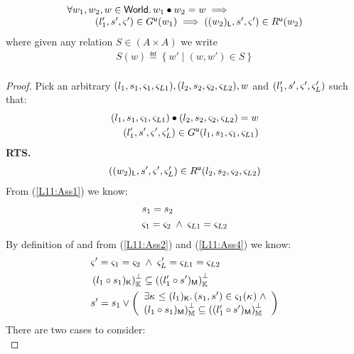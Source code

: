 \begin{lemma}[] \label{lem:updateGContainment}
%
\[
\begin{array}{l}
	\forall w_1, w_2, w \in \textsf{World}.\, w_1 \bullet w_2 = w \implies\\
	\hspace*{1cm}(l'_1, s', \varsigma_{}') \in G^{\textsf{u}}(w_1) \implies ((w_2)_{\textsf{L}}, s', \varsigma_{}') \in R^{\textsf{u}}(w_2)
\end{array}
\]
%
where given any relation $S \in (A \times A)$ we write
%
\[
\begin{array}{l}
	S(w) \eqdef \left\{w' \;|\; (w, w') \in S \right\}\\
\end{array}
\]
%
\begin{proof} Pick an arbitrary $(l_1, s_1, \varsigma_{1}, \varsigma_{L1}), (l_2, s_2, \varsigma_{2}, \varsigma_{L2}), w$ and $(l'_1, s', \varsigma_{}', \varsigma_{L}')$ such that:
%
\begin{align}
	(l_1, s_1, \varsigma_{1}, \varsigma_{L1}) \bullet (l_2, s_2, \varsigma_{2}, \varsigma_{L2}) = w \label{L11:Ass1}\\
	(l'_1, s', \varsigma_{}', \varsigma_{L}') \in G^{\textsf{u}}(l_1, s_1, \varsigma_{1}, \varsigma_{L1}) \label{L11:Ass2}
\end{align}
%
\textbf{RTS.}
%
\begin{align}
	((w_2)_{\textsf{L}}, s', \varsigma_{}', \varsigma_{L}') \in R^{\textsf{u}}(l_2, s_2, \varsigma_{2}, \varsigma_{L2}) \label{L11:Goal}
\end{align}
From (\ref{L11:Ass1}) we know:
%
\begin{align}
	&s_1 = s_2 \label{L11:Ass3}\\
	&\varsigma_{1} = \varsigma_{2} \;\land\; \varsigma_{L1} = \varsigma_{L2} \label{L11:Ass4}
\end{align}
%
By definition of \updateG and from (\ref{L11:Ass2}) and (\ref{L11:Ass4}) we know:
%
\begin{align}
	& \varsigma_{}' = \varsigma_{1} = \varsigma_{2} \;\land\; \varsigma_{L}' = \varsigma_{L1} = \varsigma_{L2} \label{L11:Ass5} \\
	& \left( l_1 \circ s_1)_{\textsf{K}}\right)_{\mathbb{K}}^{\bot} \subseteq \left( (l'_1 \circ s')_{\textsf{M}}\right)_{\mathbb{K}}^{\bot} \label{L11:Perms} \\
	& s' = s_1 \lor 
	\left(\begin{array}{l}
		\exists \kappa_{} \leq (l_1)_{\textsf{K}}.\,  (s_1, s') \in \varsigma_{1}(\kappa_{}) \;\land \\
		\left( l_1 \circ s_1)_{\textsf{M}}\right)_{\mathbb{M}}^{\bot} \subseteq \left( (l'_1 \circ s')_{\textsf{M}}\right)_{\mathbb{M}}^{\bot}
	\end{array} \right) \nonumber
\end{align}
%
There are two cases to consider:\\


\end{proof}
\end{lemma}

